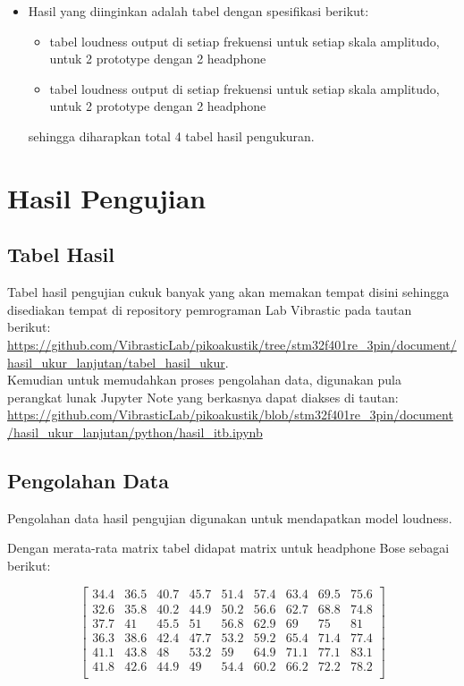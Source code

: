 \documentclass[12pt,]{article}
\begin{document}
\begin{itemize}
		\item Hasil yang diinginkan adalah tabel dengan spesifikasi berikut:
		\begin{itemize}
			\item tabel loudness output di setiap frekuensi untuk setiap skala amplitudo, untuk 2 prototype dengan 2 headphone
			\item tabel loudness output di setiap frekuensi untuk setiap skala amplitudo, untuk 2 prototype dengan 2 headphone
		\end{itemize}

		sehingga diharapkan total 4 tabel hasil pengukuran.
	\end{itemize}

	\newpage
	\section{Hasil Pengujian}

	\subsection{Tabel Hasil}

	Tabel hasil pengujian cukuk banyak yang akan memakan tempat disini sehingga disediakan tempat di repository pemrograman Lab Vibrastic pada tautan berikut:\\
	\url{https://github.com/VibrasticLab/pikoakustik/tree/stm32f401re_3pin/document/hasil_ukur_lanjutan/tabel_hasil_ukur}.\\

	Kemudian untuk memudahkan proses pengolahan data, digunakan pula perangkat lunak Jupyter Note yang berkasnya dapat diakses di tautan:\\
	\url{https://github.com/VibrasticLab/pikoakustik/blob/stm32f401re_3pin/document/hasil_ukur_lanjutan/python/hasil_itb.ipynb}\\

	\subsection{Pengolahan Data}

	Pengolahan data hasil pengujian digunakan untuk mendapatkan model loudness.

		Dengan merata-rata matrix tabel didapat matrix untuk headphone Bose sebagai berikut:

		\[\left[
		\begin{matrix}
			34.4 & 36.5 & 40.7 & 45.7 & 51.4 & 57.4 & 63.4 & 69.5 & 75.6 \\
			32.6 & 35.8 & 40.2 & 44.9 & 50.2 & 56.6 & 62.7 & 68.8 & 74.8 \\
			37.7 & 41   & 45.5 & 51   & 56.8 & 62.9 & 69   & 75   & 81   \\
			36.3 & 38.6 & 42.4 & 47.7 & 53.2 & 59.2 & 65.4 & 71.4 & 77.4 \\
			41.1 & 43.8 & 48   & 53.2 & 59   & 64.9 & 71.1 & 77.1 & 83.1 \\
			41.8 & 42.6 & 44.9 & 49   & 54.4 & 60.2 & 66.2 & 72.2 & 78.2 \\
		\end{matrix}
		\right]\]
\end{document}
